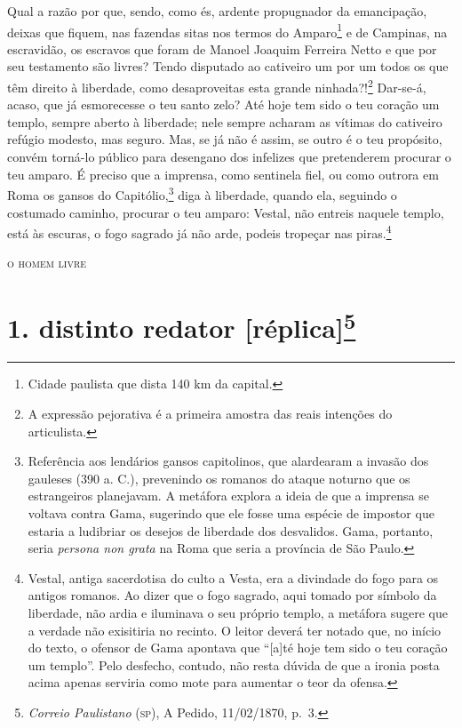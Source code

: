 Qual a razão por que, sendo, como és, ardente propugnador da
emancipação, deixas que fiquem, nas fazendas sitas nos termos do
Amparo\footnote{ Cidade paulista que dista 140 km da capital.} e de
Campinas, na escravidão, os escravos que foram de Manoel Joaquim
Ferreira Netto e que por seu testamento são livres? Tendo disputado ao
cativeiro um por um todos os que têm direito à liberdade, como
desaproveitas esta grande ninhada?!\footnote{ A expressão pejorativa é
  a primeira amostra das reais intenções do articulista.} Dar-se-á,
acaso, que já esmorecesse o teu santo zelo? Até hoje tem sido o teu
coração um templo, sempre aberto à liberdade; nele sempre acharam as
vítimas do cativeiro refúgio modesto, mas seguro. Mas, se já não é
assim, se outro é o teu propósito, convém torná-lo público para
desengano dos infelizes que pretenderem procurar o teu amparo. É preciso
que a imprensa, como sentinela fiel, ou como outrora em Roma os gansos
do Capitólio,\footnote{ Referência aos lendários gansos capitolinos,
  que alardearam a invasão dos gauleses (390 a. C.), prevenindo os
  romanos do ataque noturno que os estrangeiros planejavam. A metáfora
  explora a ideia de que a imprensa se voltava contra Gama, sugerindo
  que ele fosse uma espécie de impostor que estaria a ludibriar os
  desejos de liberdade dos desvalidos. Gama, portanto, seria
  \emph{persona non grata} na Roma que seria a província de São Paulo.}
diga à liberdade, quando ela, seguindo o costumado caminho, procurar o
teu amparo: Vestal, não entreis naquele templo, está às escuras, o fogo
sagrado já não arde, podeis tropeçar nas piras.\footnote{ Vestal,
  antiga sacerdotisa do culto a Vesta, era a divindade do fogo para os
  antigos romanos. Ao dizer que o fogo sagrado, aqui tomado por símbolo
  da liberdade, não ardia e iluminava o seu próprio templo, a metáfora
  sugere que a verdade não exisitiria no recinto. O leitor deverá ter
  notado que, no início do texto, o ofensor de Gama apontava que
  ``{[}a{]}té hoje tem sido o teu coração um templo''. Pelo desfecho,
  contudo, não resta dúvida de que a ironia posta acima apenas serviria
  como mote para aumentar o teor da ofensa.}

\begin{flushright}
\textsc{o homem livre}
\end{flushright}

\chapter{1. distinto redator {[}réplica{]}\footnote{\emph{Correio Paulistano} (\textsc{sp}), A Pedido, 11/02/1870,
  p.~3.}} %

